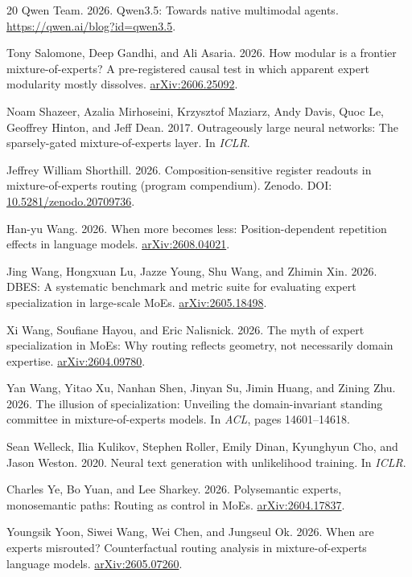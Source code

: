 \documentclass[10pt,a4paper,twocolumn]{article}
\begin{document}
\begin{thebibliography}{20}
Qwen Team. 2026. Qwen3.5: Towards native multimodal agents.
\url{https://qwen.ai/blog?id=qwen3.5}.

Tony Salomone, Deep Gandhi, and Ali Asaria. 2026. How modular is a frontier
mixture-of-experts? A pre-registered causal test in which apparent expert
modularity mostly dissolves. \href{https://arxiv.org/abs/2606.25092}{arXiv:2606.25092}.

Noam Shazeer, Azalia Mirhoseini, Krzysztof Maziarz, Andy Davis, Quoc Le,
Geoffrey Hinton, and Jeff Dean. 2017. Outrageously large neural networks: The
sparsely-gated mixture-of-experts layer. In \emph{ICLR}.

Jeffrey William Shorthill. 2026. Composition-sensitive register readouts in
mixture-of-experts routing (program compendium). Zenodo.
DOI: \href{https://doi.org/10.5281/zenodo.20709736}{10.5281/zenodo.20709736}.

Han-yu Wang. 2026. When more becomes less: Position-dependent repetition
effects in language models. \href{https://arxiv.org/abs/2608.04021}{arXiv:2608.04021}.

Jing Wang, Hongxuan Lu, Jazze Young, Shu Wang, and Zhimin Xin. 2026. DBES: A
systematic benchmark and metric suite for evaluating expert specialization in
large-scale MoEs. \href{https://arxiv.org/abs/2605.18498}{arXiv:2605.18498}.

Xi Wang, Soufiane Hayou, and Eric Nalisnick. 2026. The myth of expert
specialization in MoEs: Why routing reflects geometry, not necessarily domain
expertise. \href{https://arxiv.org/abs/2604.09780}{arXiv:2604.09780}.

Yan Wang, Yitao Xu, Nanhan Shen, Jinyan Su, Jimin Huang, and Zining Zhu. 2026.
The illusion of specialization: Unveiling the domain-invariant standing
committee in mixture-of-experts models. In \emph{ACL}, pages 14601--14618.

Sean Welleck, Ilia Kulikov, Stephen Roller, Emily Dinan, Kyunghyun Cho, and
Jason Weston. 2020. Neural text generation with unlikelihood training. In
\emph{ICLR}.

Charles Ye, Bo Yuan, and Lee Sharkey. 2026. Polysemantic experts, monosemantic
paths: Routing as control in MoEs. \href{https://arxiv.org/abs/2604.17837}{arXiv:2604.17837}.

Youngsik Yoon, Siwei Wang, Wei Chen, and Jungseul Ok. 2026. When are experts
misrouted? Counterfactual routing analysis in mixture-of-experts language
models. \href{https://arxiv.org/abs/2605.07260}{arXiv:2605.07260}.

\end{thebibliography}
\end{document}
